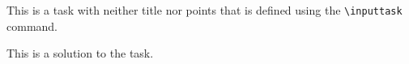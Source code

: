 This is a task with neither title nor points that is defined using the \texttt{\textbackslash inputtask} command.

\begin{solution}
    This is a solution to the task.
\end{solution}
